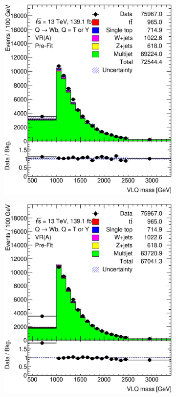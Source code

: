 \begin{figure}[hbt!]
\begin{subfigure}{.35\textwidth}
		\includegraphics[width=\linewidth,height=\textheight,keepaspectratio]{figs/chapter5/prefitbinbybin/VR_B_VLQM.eps}
		\caption{}
		\label{fig:abcd:furtherimprovement:scaledcorr:prefit:bin:VLQM}
	\end{subfigure}
	\begin{subfigure}{.35\textwidth}
		\centering
		\includegraphics[width=\linewidth,height=\textheight,keepaspectratio]{figs/chapter5/postfitintegral/VR_B_VLQM.eps}

\end{subfigure}
\end{figure}
